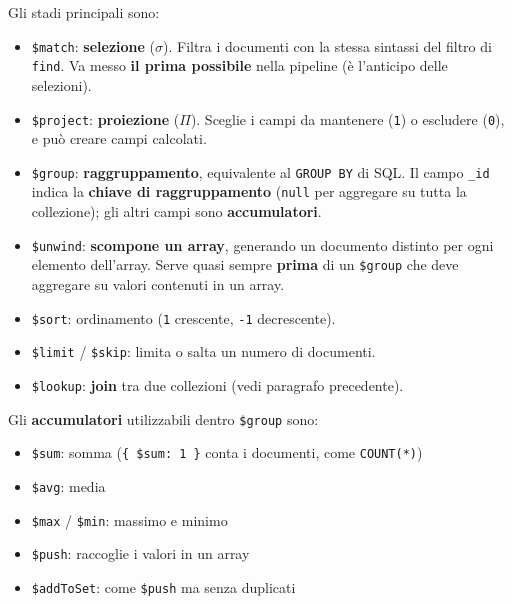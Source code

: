 \documentclass[a4paper,twoside]{article}
\begin{document}
\vspace{1em}
\noindent
Gli stadi principali sono:
\begin{itemize}
  \item \texttt{\$match}: \textbf{selezione} (\( \sigma \)). Filtra i documenti con la
    stessa sintassi del filtro di \texttt{find}. Va messo \textbf{il prima possibile}
    nella pipeline (è l'anticipo delle selezioni).

  \item \texttt{\$project}: \textbf{proiezione} (\( \Pi \)). Sceglie i campi da mantenere
    (\texttt{1}) o escludere (\texttt{0}), e può creare campi calcolati.

  \item \texttt{\$group}: \textbf{raggruppamento}, equivalente al \texttt{GROUP BY} di
    SQL. Il campo \texttt{\_id} indica la \textbf{chiave di raggruppamento}
    (\texttt{null} per aggregare su tutta la collezione); gli altri campi sono
    \textbf{accumulatori}.

  \item \texttt{\$unwind}: \textbf{scompone un array}, generando un documento distinto
    per ogni elemento dell'array. Serve quasi sempre \textbf{prima} di un
    \texttt{\$group} che deve aggregare su valori contenuti in un array.

  \item \texttt{\$sort}: ordinamento (\texttt{1} crescente, \texttt{-1} decrescente).

  \item \texttt{\$limit} / \texttt{\$skip}: limita o salta un numero di documenti.

  \item \texttt{\$lookup}: \textbf{join} tra due collezioni (vedi paragrafo precedente).
\end{itemize}

\vspace{1em}
\noindent
Gli \textbf{accumulatori} utilizzabili dentro \texttt{\$group} sono:
\begin{itemize}
  \item \texttt{\$sum}: somma (\texttt{\{ \$sum: 1 \}} conta i documenti, come
    \texttt{COUNT(*)})
  \item \texttt{\$avg}: media
  \item \texttt{\$max} / \texttt{\$min}: massimo e minimo
  \item \texttt{\$push}: raccoglie i valori in un array
  \item \texttt{\$addToSet}: come \texttt{\$push} ma senza duplicati
\end{itemize}
\end{document}
